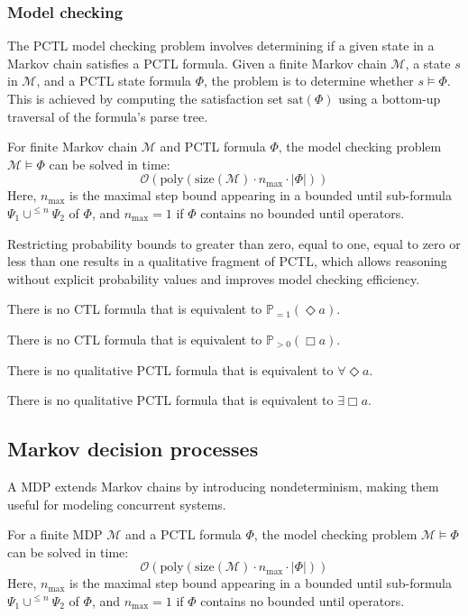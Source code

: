 \subsubsection{Model checking}
The PCTL model checking problem involves determining if a given state in a Markov chain satisfies a PCTL formula. 
Given a finite Markov chain $\mathcal{M}$, a state $s$ in $\mathcal{M}$, and a PCTL state formula $\Phi$, the problem is to determine whether $s \models \Phi$.
This is achieved by computing the satisfaction set $\text{sat}(\Phi)$ using a bottom-up traversal of the formula's parse tree.
\begin{theorem}
    For finite Markov chain $\mathcal{M}$ and PCTL formula $\Phi$, the model checking problem $\mathcal{M} \models \Phi$ can be solved in time: 
    \[\mathcal{O}\left(\text{poly}\left(\text{size}\left(\mathcal{M}\right)\cdot n_{\max}\cdot\left\lvert \Phi\right\rvert\right)\right)\]
    Here, $n_{\max}$ is the maximal step bound appearing in a bounded until sub-formula $\Psi_1\cup^{\leq n}\Psi_2$ of $\Phi$, and $n_{\max}=1$ if $\Phi$ contains no bounded until operators.
\end{theorem}
Restricting probability bounds to greater than zero, equal to one, equal to zero or less than one results in a qualitative fragment of PCTL, which allows reasoning without explicit probability values and improves model checking efficiency.
\begin{property}
    There is no CTL formula that is equivalent to $\mathbb{P}_{=1}(\Diamond a)$.
\end{property}
\begin{property}
    There is no CTL formula that is equivalent to $\mathbb{P}_{>0}(\Box a)$.
\end{property}
\begin{property}
    There is no qualitative PCTL formula that is equivalent to $\forall\Diamond a$. 
\end{property}
\begin{property}
    There is no qualitative PCTL formula that is equivalent to $\exists\Box a$.
\end{property}

\subsection{Markov decision processes}
A MDP extends Markov chains by introducing nondeterminism, making them useful for modeling concurrent systems.
\begin{theorem}
    For a finite MDP $\mathcal{M}$ and a PCTL formula $\Phi$, the model checking problem $\mathcal{M} \models \Phi$ can be solved in time:
       \[\mathcal{O}\left(\text{poly}\left(\text{size}\left(\mathcal{M}\right)\cdot n_{\max}\cdot\left\lvert \Phi\right\rvert\right)\right)\]
    Here, $n_{\max}$ is the maximal step bound appearing in a bounded until sub-formula $\Psi_1\cup^{\leq n}\Psi_2$ of $\Phi$, and $n_{\max}=1$ if $\Phi$ contains no bounded until operators.
\end{theorem}